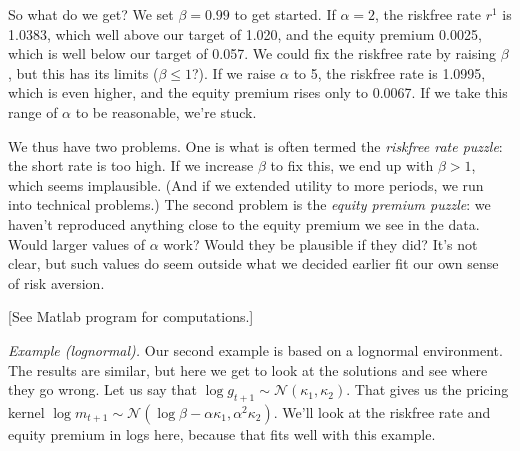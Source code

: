 \documentclass[11pt]{article}
\begin{document}
So what do we get?
We set $\beta = 0.99$ to get started.
If $\alpha = 2$, the riskfree rate $r^1$ is 1.0383, which well above our target of 1.020,
and the equity premium 0.0025, which is well below our target of 0.057.
We could fix the riskfree rate by raising $\beta$,
but this has its limits ($\beta \leq 1$?).
If we raise $\alpha$ to 5, the riskfree rate is 1.0995,
which is even higher,
and the equity premium rises only to 0.0067.
If we take this range of $\alpha$ to be reasonable, we're stuck.

We thus have two problems.
One is what is often termed the {\it riskfree rate puzzle\/}:
the short rate is too high.
If we increase $\beta$ to fix this, we end up with $\beta>1$,
which seems implausible.
(And if we extended utility to more periods, we run into technical problems.)
The second problem is the {\it equity premium puzzle\/}:
we haven't reproduced anything close to the equity premium we see in the data.
Would larger values of $\alpha$ work?  Would they be plausible if they did?
It's not clear, but such values do seem outside what we decided earlier
fit our own sense of risk aversion.

[See Matlab program for computations.]


{\it Example (lognormal).}
Our second example is based on a lognormal environment.
The results are similar, but here we get to look at the solutions
and see where they go wrong.
Let us say that $\log g_{t+1} \sim \mathcal{N}(\kappa_1, \kappa_2)$.
That gives us the pricing kernel
$\log m_{t+1} \sim \mathcal{N}(\log \beta - \alpha \kappa_1, \alpha^2 \kappa_2)$.
We'll look at the riskfree rate and equity premium in logs here,
because that fits well with this example.
\end{document}
